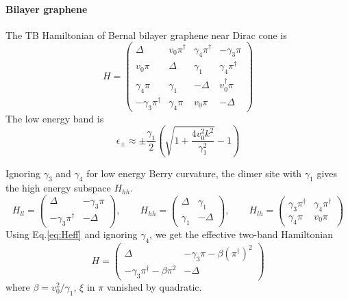 \documentclass[12pt,a4paper]{article}
\begin{document}
\paragraph{Bilayer graphene}

    The TB Hamiltonian of Bernal bilayer graphene near Dirac cone is
    \begin{equation}
        H = \begin{pmatrix}
            \Delta                  & v_0 \pi^\dagger   & \gamma_4 \pi^\dagger  & -\gamma_3 \pi         \\
            v_0 \pi                 & \Delta            & \gamma_1              & \gamma_4 \pi^\dagger  \\
            \gamma_4 \pi            & \gamma_1          & -\Delta               &  v_0^\dagger \pi      \\
            -\gamma_3 \pi^\dagger   & \gamma_4 \pi      & v_0 \pi               & -\Delta
        \end{pmatrix}
    \end{equation}
    The low energy band is
    \begin{equation}
        \epsilon_{\pm} \approx \pm \frac{\gamma_1}{2} \left( \sqrt{1 + \frac{4v_0^2k^2}{\gamma_1^2}} - 1\right)
    \end{equation}

    Ignoring $\gamma_3$ and $\gamma_4$ for low energy Berry curvature, the dimer site with $\gamma_1$ gives the high energy subspace $H_{hh}$.
    \[
        H_{ll} = \begin{pmatrix}
            \Delta                  & -\gamma_3 \pi \\
            -\gamma_3 \pi^\dagger   & -\Delta
        \end{pmatrix}, \qquad
        H_{hh} = \begin{pmatrix}
            \Delta      & \gamma_1  \\
            \gamma_1    & -\Delta
        \end{pmatrix}, \qquad
        H_{lh} = \begin{pmatrix}
            \gamma_3 \pi^\dagger    & \gamma_4 \pi^\dagger \\
            \gamma_4 \pi            & v_0 \pi
        \end{pmatrix}
    \]
    Using Eq.\eqref{eq:Heff} and ignoring $\gamma_4$, we get the effective two-band Hamiltonian
    \begin{equation}
        H = \begin{pmatrix}
            \Delta                                  & -\gamma_3 \pi -\beta (\pi^\dagger)^2 \\
            -\gamma_3 \pi^\dagger - \beta \pi^2     & -\Delta
        \end{pmatrix}
    \end{equation}
    where $\beta = v_0^2/\gamma_1$, $\xi$ in $\pi$ vanished by quadratic.
\end{document}
